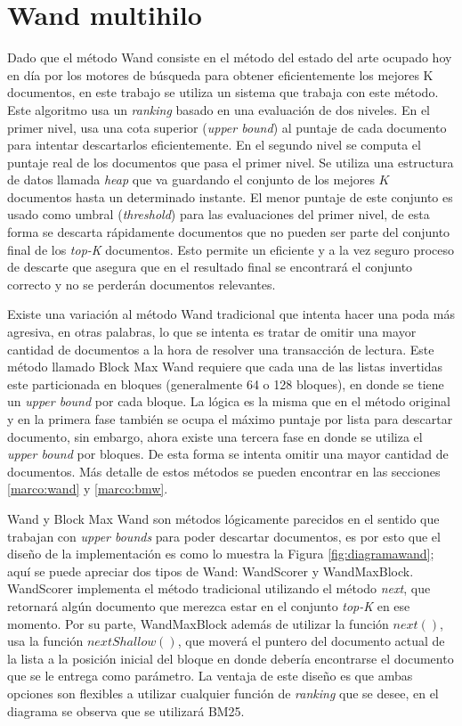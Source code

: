 \chapter{Wand multihilo}
\label{cap:wand}
Dado que el método Wand \citep{Broder:2003} consiste en el método del estado del arte ocupado hoy en día por los motores de búsqueda para obtener eficientemente los mejores K documentos, en este trabajo se utiliza un sistema que trabaja con este método. Este algoritmo usa un \textit{ranking} basado en una evaluación de dos niveles. En el primer nivel, usa una cota superior (\textit{upper bound}) al puntaje de cada documento para intentar descartarlos eficientemente. En el segundo nivel se computa el puntaje real de los documentos que pasa el primer nivel. Se utiliza una estructura de datos llamada \textit{heap} que va guardando el conjunto de los mejores $K$ documentos hasta un determinado instante. El menor puntaje de este conjunto es usado como umbral (\textit{threshold}) para las evaluaciones del primer nivel, de esta forma se descarta rápidamente documentos que no pueden ser parte del conjunto final de los \textit{top-K} documentos. Esto permite un eficiente y a la vez seguro proceso de descarte que asegura que en el resultado final se encontrará el conjunto correcto y no se perderán documentos relevantes.

Existe una variación al método Wand tradicional que intenta hacer una poda más agresiva, en otras palabras, lo que se intenta es tratar de omitir una mayor cantidad de documentos a la hora de resolver una transacción de lectura. Este método llamado Block Max Wand requiere que cada una de las listas invertidas este particionada en bloques (generalmente 64 o 128 bloques), en donde se tiene un \textit{upper bound} por cada bloque. La lógica es la misma que en el método original y en la primera fase también se ocupa el máximo puntaje por lista para descartar documento, sin embargo, ahora existe una tercera fase en donde se utiliza el \textit{upper bound} por bloques. De esta forma se intenta omitir una mayor cantidad de documentos. Más detalle de estos métodos se pueden encontrar en las secciones \ref{marco:wand} y \ref{marco:bmw}.

Wand y Block Max Wand son métodos lógicamente parecidos en el sentido que trabajan con \textit{upper bounds} para poder descartar documentos, es por esto que el diseño de la implementación es como lo muestra la Figura \ref{fig:diagramawand}; aquí se puede apreciar dos tipos de Wand: WandScorer y WandMaxBlock. WandScorer implementa el método tradicional utilizando el método \textit{next}, que retornará algún documento que merezca estar en el conjunto \textit{top-K} en ese momento. Por su parte, WandMaxBlock además de utilizar la función \textit{$next()$}, usa la función \textit{$nextShallow()$}, que moverá el puntero del documento actual de la lista a la posición inicial del bloque en donde debería encontrarse el documento que se le entrega como parámetro. 
La ventaja de este diseño es que ambas opciones son flexibles a utilizar cualquier función de \textit{ranking} que se desee, en el diagrama se observa que se utilizará BM25.

